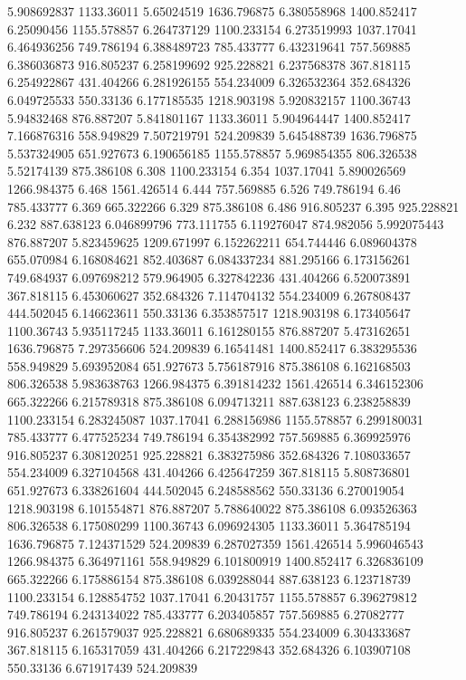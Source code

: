 5.908692837	1133.36011
5.65024519	1636.796875
6.380558968	1400.852417
6.25090456	1155.578857
6.264737129	1100.233154
6.273519993	1037.17041
6.464936256	749.786194
6.388489723	785.433777
6.432319641	757.569885
6.386036873	916.805237
6.258199692	925.228821
6.237568378	367.818115
6.254922867	431.404266
6.281926155	554.234009
6.326532364	352.684326
6.049725533	550.33136
6.177185535	1218.903198
5.920832157	1100.36743
5.94832468	876.887207
5.841801167	1133.36011
5.904964447	1400.852417
7.166876316	558.949829
7.507219791	524.209839
5.645488739	1636.796875
5.537324905	651.927673
6.190656185	1155.578857
5.969854355	806.326538
5.52174139	875.386108
6.308	1100.233154
6.354	1037.17041
5.890026569	1266.984375
6.468	1561.426514
6.444	757.569885
6.526	749.786194
6.46	785.433777
6.369	665.322266
6.329	875.386108
6.486	916.805237
6.395	925.228821
6.232	887.638123
6.046899796	773.111755
6.119276047	874.982056
5.992075443	876.887207
5.823459625	1209.671997
6.152262211	654.744446
6.089604378	655.070984
6.168084621	852.403687
6.084337234	881.295166
6.173156261	749.684937
6.097698212	579.964905
6.327842236	431.404266
6.520073891	367.818115
6.453060627	352.684326
7.114704132	554.234009
6.267808437	444.502045
6.146623611	550.33136
6.353857517	1218.903198
6.173405647	1100.36743
5.935117245	1133.36011
6.161280155	876.887207
5.473162651	1636.796875
7.297356606	524.209839
6.16541481	1400.852417
6.383295536	558.949829
5.693952084	651.927673
5.756187916	875.386108
6.162168503	806.326538
5.983638763	1266.984375
6.391814232	1561.426514
6.346152306	665.322266
6.215789318	875.386108
6.094713211	887.638123
6.238258839	1100.233154
6.283245087	1037.17041
6.288156986	1155.578857
6.299180031	785.433777
6.477525234	749.786194
6.354382992	757.569885
6.369925976	916.805237
6.308120251	925.228821
6.383275986	352.684326
7.108033657	554.234009
6.327104568	431.404266
6.425647259	367.818115
5.808736801	651.927673
6.338261604	444.502045
6.248588562	550.33136
6.270019054	1218.903198
6.101554871	876.887207
5.788640022	875.386108
6.093526363	806.326538
6.175080299	1100.36743
6.096924305	1133.36011
5.364785194	1636.796875
7.124371529	524.209839
6.287027359	1561.426514
5.996046543	1266.984375
6.364971161	558.949829
6.101800919	1400.852417
6.326836109	665.322266
6.175886154	875.386108
6.039288044	887.638123
6.123718739	1100.233154
6.128854752	1037.17041
6.20431757	1155.578857
6.396279812	749.786194
6.243134022	785.433777
6.203405857	757.569885
6.27082777	916.805237
6.261579037	925.228821
6.680689335	554.234009
6.304333687	367.818115
6.165317059	431.404266
6.217229843	352.684326
6.103907108	550.33136
6.671917439	524.209839
